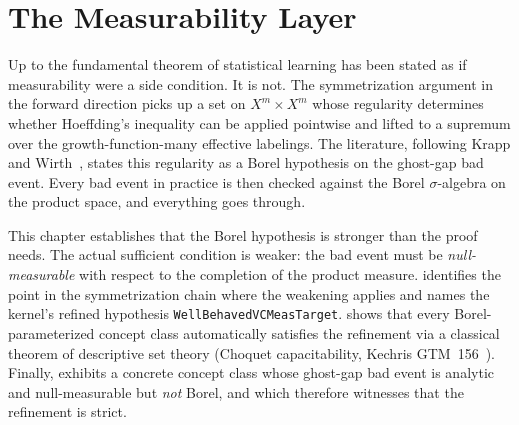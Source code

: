 %
%

\chapter{The Measurability Layer}\label{chap:measurability}

Up to  the fundamental theorem of statistical learning
has been stated as if measurability were a side condition. It is not.
The symmetrization argument in the forward direction picks up a set on
$X^m \times X^m$ whose regularity determines whether Hoeffding's
inequality can be applied pointwise and lifted to a supremum over the
growth-function-many effective labelings. The literature, following
Krapp and Wirth~\cite{KrappWirth2024}, states this regularity as a
Borel hypothesis on the ghost-gap bad event. Every bad event in
practice is then checked against the Borel $\sigma$-algebra on the
product space, and everything goes through.

This chapter establishes that the Borel hypothesis is stronger than
the proof needs. The actual sufficient condition is weaker: the bad
event must be \emph{null-measurable} with respect to the completion
of the product measure.  identifies the point
in the symmetrization chain where the weakening applies and names the
kernel's refined hypothesis \texttt{WellBehavedVCMeasTarget}.
 shows that every Borel-parameterized concept
class automatically satisfies the refinement via a classical theorem
of descriptive set theory (Choquet capacitability, Kechris
GTM~156~\cite[Theorem 30.13]{Kechris1995}). Finally,
 exhibits a concrete concept class whose
ghost-gap bad event is analytic and null-measurable but \emph{not}
Borel, and which therefore witnesses that the refinement is strict.

